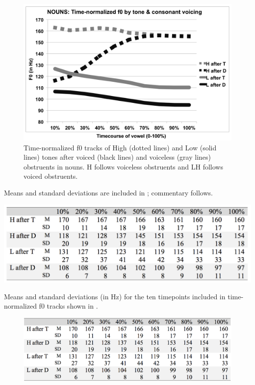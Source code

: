 \documentclass[output=paper
,newtxmath
,modfonts
,nonflat]{langsci/langscibook}
\begin{document}
  
\begin{figure}

\includegraphics[width=\textwidth]{figures/fig-lotven-4.png}
\caption{\label{fig:lotven:4} Time-normalized f0 tracks of High (dotted lines) and Low (solid lines) tones after voiced (black lines) and voiceless (gray lines) obstruents in nouns. H follows voiceless obstruents and LH follows voiced obstruents.}
\end{figure}


Means and standard deviations are included in ; commentary follows.

\begin{table} 
\includegraphics[width=\textwidth]{figures/tab-lotven-2.png}
\caption{Means and standard deviations (in Hz) for the ten timepoints included in time-normalized f0 tracks shown in .}
\label{tab:lotven:2}
\end{table}
  
\begin{figure}
\includegraphics[width=\textwidth]{figures/Lotven-img5.png}
\caption{\nocaption}
\end{figure}
\end{document}
